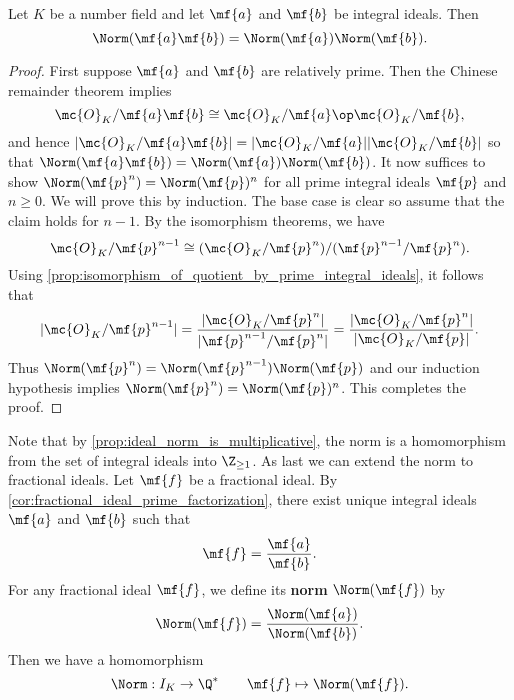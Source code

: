     \begin{proposition}\label{prop:ideal_norm_is_multiplicative}
      Let $K$ be a number field and let $\mf{a}$ and $\mf{b}$ be integral ideals. Then
      \[
        \Norm(\mf{a}\mf{b}) = \Norm(\mf{a})\Norm(\mf{b}).
      \]
    \end{proposition}
    \begin{proof}
      First suppose $\mf{a}$ and $\mf{b}$ are relatively prime. Then the Chinese remainder theorem implies
      \[
        \mc{O}_{K}/\mf{a}\mf{b} \cong \mc{O}_{K}/\mf{a} \op \mc{O}_{K}/\mf{b},
      \]
      and hence $|\mc{O}_{K}/\mf{a}\mf{b}| = |\mc{O}_{K}/\mf{a}||\mc{O}_{K}/\mf{b}|$ so that $\Norm(\mf{a}\mf{b}) = \Norm(\mf{a})\Norm(\mf{b})$. It now suffices to show $\Norm(\mf{p}^{n}) = \Norm(\mf{p})^{n}$ for all prime integral ideals $\mf{p}$ and $n \ge 0$. We will prove this by induction. The base case is clear so assume that the claim holds for $n-1$. By the isomorphism theorems, we have
      \[
        \mc{O}_{K}/\mf{p}^{n-1} \cong (\mc{O}_{K}/\mf{p}^{n})/(\mf{p}^{n-1}/\mf{p}^{n}).
      \]
      Using \cref{prop:isomorphism_of_quotient_by_prime_integral_ideals}, it follows that
      \[
        |\mc{O}_{K}/\mf{p}^{n-1}| = \frac{|\mc{O}_{K}/\mf{p}^{n}|}{|\mf{p}^{n-1}/\mf{p}^{n}|} = \frac{|\mc{O}_{K}/\mf{p}^{n}|}{|\mc{O}_{K}/\mf{p}|}.
      \]
      Thus $\Norm(\mf{p}^{n}) = \Norm(\mf{p}^{n-1})\Norm(\mf{p})$ and our induction hypothesis implies $\Norm(\mf{p}^{n}) = \Norm(\mf{p})^{n}$. This completes the proof.
    \end{proof}

    Note that by \cref{prop:ideal_norm_is_multiplicative}, the norm is a homomorphism from the set of integral ideals into $\Z_{\ge 1}$. As last we can extend the norm to fractional ideals. Let $\mf{f}$ be a fractional ideal. By \cref{cor:fractional_ideal_prime_factorization}, there exist unique integral ideals $\mf{a}$ and $\mf{b}$ such that
    \[
      \mf{f} = \frac{\mf{a}}{\mf{b}}.
    \]
    For any fractional ideal $\mf{f}$, we define its \textbf{norm} $\Norm(\mf{f})$ by
    \[
      \Norm(\mf{f}) = \frac{\Norm(\mf{a})}{\Norm(\mf{b})}.
    \]
    Then we have a homomorphism
    \[
      \Norm:I_{K} \to \Q^{\ast} \qquad \mf{f} \mapsto \Norm(\mf{f}).
    \]
